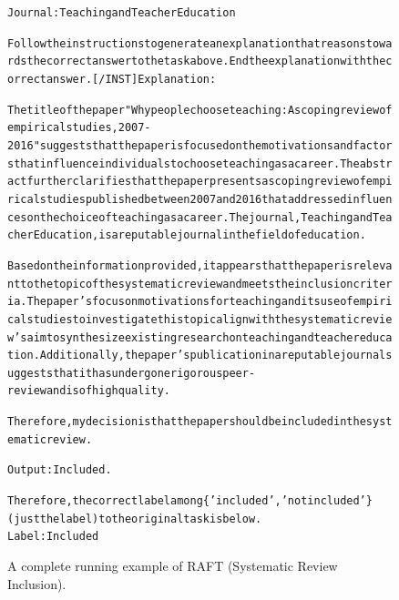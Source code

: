 \begin{figure}[t]
{{\begin{alltt}
Journal: Teaching and Teacher Education

Follow the instructions to generate an explanation that reasons towards the correct answer to the task above. End the explanation with the correct answer. [/INST] Explanation: 

The title of the paper "Why people choose teaching: A scoping review of empirical studies, 2007-2016" suggests that the paper is focused on the motivations and factors that influence individuals to choose teaching as a career. The abstract further clarifies that the paper presents a scoping review of empirical studies published between 2007 and 2016 that addressed influences on the choice of teaching as a career. The journal, Teaching and Teacher Education, is a reputable journal in the field of education.

Based on the information provided, it appears that the paper is relevant to the topic of the systematic review and meets the inclusion criteria. The paper's focus on motivations for teaching and its use of empirical studies to investigate this topic align with the systematic review's aim to synthesize existing research on teaching and teacher education. Additionally, the paper's publication in a reputable journal suggests that it has undergone rigorous peer-review and is of high quality.

Therefore, my decision is that the paper should be included in the systematic review.

Output: Included.

Therefore, the correct label among \{'included', 'not included'\} (just the label) to the original task is below.
Label: Included
\end{alltt}
}}
\caption{A complete running example of RAFT (Systematic Review Inclusion).}
\label{fig:raft_subset=systematic_review_inclusion_example}
\end{figure}
